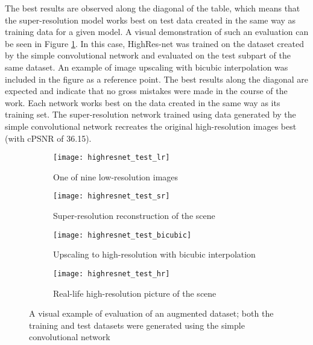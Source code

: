 The best results are observed along the diagonal of the table, which means that the super-resolution model works best on test data created in the same way as training data for a given model.
A visual demonstration of such an evaluation can be seen in Figure \ref{fig:highresnet-test-visual}.
In this case, HighRes-net was trained on the dataset created by the simple convolutional network and evaluated on the test subpart of the same dataset.
An example of image upscaling with bicubic interpolation was included in the figure as a reference point.
The best results along the diagonal are expected and indicate that no gross mistakes were made in the course of the work.
Each network works best on the data created in the same way as its training set.
The super-resolution network trained using data generated by the simple convolutional network recreates the original high-resolution images best (with cPSNR of 36.15).
\begin{figure}
    \centering
    \begin{subfigure}[t]{0.45\textwidth}
        \centering
        \texttt{[image: highresnet\_test\_lr]}
        \caption{One of nine low-resolution images}
    \end{subfigure}
    \hfill
    \begin{subfigure}[t]{0.45\textwidth}
        \centering
        \texttt{[image: highresnet\_test\_sr]}
        \caption{Super-resolution reconstruction of the scene}
    \end{subfigure}
    \begin{subfigure}[t]{0.45\textwidth}
        \centering
        \texttt{[image: highresnet\_test\_bicubic]}
        \caption{Upscaling to high-resolution with bicubic interpolation}
    \end{subfigure}
    \hfill
    \begin{subfigure}[t]{0.45\textwidth}
        \centering
        \texttt{[image: highresnet\_test\_hr]}
        \caption{Real-life high-resolution picture of the scene}
    \end{subfigure}
    \caption{A visual example of evaluation of an augmented dataset; both the training and test datasets were generated using the simple convolutional network}
    \label{fig:highresnet-test-visual}
\end{figure}

